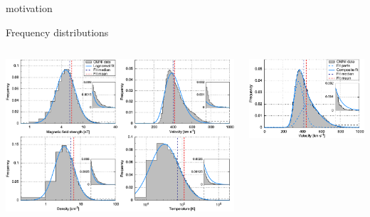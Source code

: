 \begin{frame}[c]{}{}
	motivation
\end{frame}
\begin{frame}[c]{Frequency distributions}{}
	\begin{columns}[c]	%
	
		\hspace*{-21pt}
		\includegraphics[width=1.1\textwidth]{../figures_paper/histogram_fits_4_a_zoom_paper_pdfplot.pdf}

	
		\hspace*{-10pt}
		\includegraphics[width=1.2\textwidth]{../figures_paper/histogram_fits_V_a_zoom_dbl_paper_pdfplot.pdf}

	\end{columns}
	\vspace*{\fill} \hfill \hyperlink{lognormal_distribution}{}
\end{frame}
